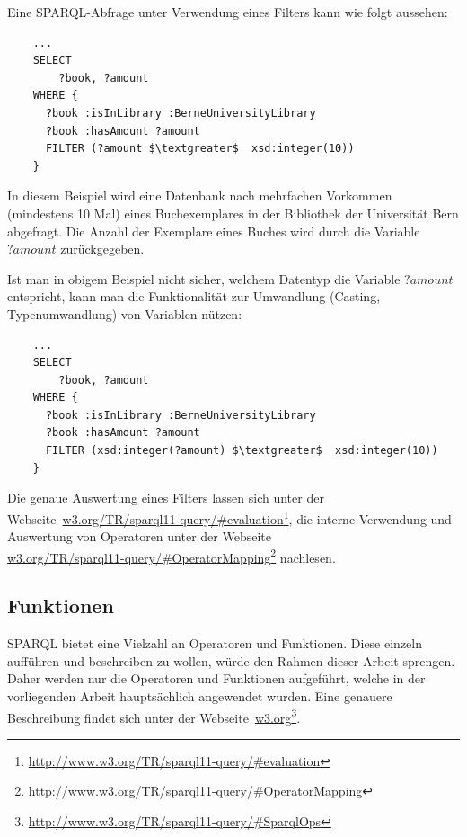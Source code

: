 Eine SPARQL-Abfrage unter Verwendung eines Filters kann wie folgt aussehen:
\begin{lstlisting}
    ...
    SELECT
        ?book, ?amount
    WHERE {
      ?book :isInLibrary :BerneUniversityLibrary
      ?book :hasAmount ?amount
      FILTER (?amount $\textgreater$  xsd:integer(10))
    }
\end{lstlisting}
In diesem Beispiel wird eine Datenbank nach mehrfachen Vorkommen (mindestens 10 Mal) eines Buchexemplares in der Bibliothek der Universität Bern abgefragt. Die Anzahl der Exemplare eines Buches wird durch die Variable $?amount$ zurückgegeben.

Ist man in obigem Beispiel nicht sicher, welchem Datentyp die Variable $?amount$ entspricht, kann man die Funktionalität zur Umwandlung (Casting, Typenumwandlung) von Variablen nützen:
\begin{lstlisting}
    ...
    SELECT
        ?book, ?amount
    WHERE {
      ?book :isInLibrary :BerneUniversityLibrary
      ?book :hasAmount ?amount
      FILTER (xsd:integer(?amount) $\textgreater$  xsd:integer(10))
    }
\end{lstlisting}

Die genaue Auswertung eines Filters lassen sich unter der Webseite~\href{http://www.w3.org/TR/sparql11-query/\#evaluation}{w3.org/TR/sparql11-query/\#evaluation}\footnote{\url{http://www.w3.org/TR/sparql11-query/\#evaluation}}, die interne Verwendung und Auswertung von Operatoren unter der Webseite\\
\href{http://www.w3.org/TR/sparql11-query/\#OperatorMapping}{w3.org/TR/sparql11-query/\#OperatorMapping}\footnote{\url{http://www.w3.org/TR/sparql11-query/\#OperatorMapping}} nachlesen.

\subsection{Funktionen}
\label{subsec:sparql_ausdruecke_funktionen}

SPARQL bietet eine Vielzahl an Operatoren und Funktionen. Diese einzeln aufführen und beschreiben zu wollen, würde den Rahmen dieser Arbeit sprengen. Daher werden nur die Operatoren und Funktionen aufgeführt, welche in der vorliegenden Arbeit hauptsächlich angewendet wurden. Eine genauere Beschreibung findet sich unter der Webseite~\href{http://www.w3.org/TR/sparql11-query/\#SparqlOps}{w3.org}\footnote{\url{http://www.w3.org/TR/sparql11-query/\#SparqlOps}}.

